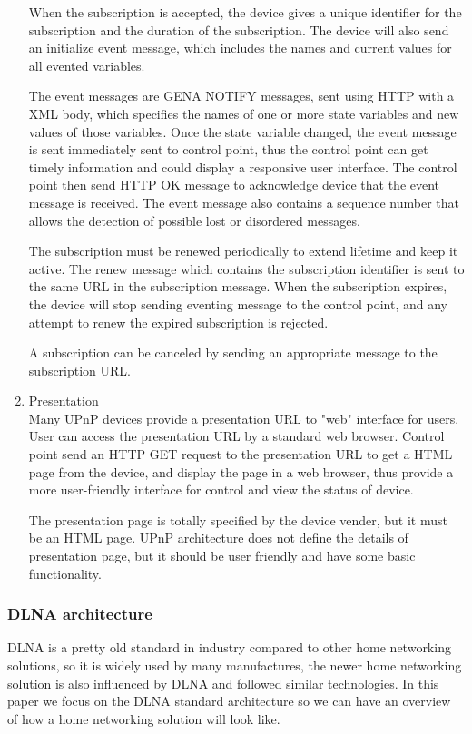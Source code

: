 \begin{enumerate}
When the subscription is accepted, the device gives a unique identifier for the subscription and 
the duration of the subscription. The device will also send an initialize event message, which 
includes the names and current values for all evented variables.

The event messages are GENA NOTIFY messages, sent using HTTP with a XML body, which specifies the 
names of one or more state variables and new values of those variables. Once the state variable 
changed, the event message is sent immediately sent to control point, thus the control point can 
get timely information and could display a responsive user interface. The control point then send 
HTTP OK message to acknowledge device that the event message is received. The event message also 
contains a sequence number that allows the detection of possible lost or disordered messages.

The subscription must be renewed periodically to extend lifetime and keep it active. The renew 
message which contains the subscription identifier is sent to the same URL in the subscription 
message. When the subscription expires, the device will stop sending eventing message to the 
control point, and any attempt to renew the expired subscription is rejected.

A subscription can be canceled by sending an appropriate message to the subscription URL.

\item Presentation \\
Many UPnP devices provide a presentation URL to "web" interface for users. User can access the 
presentation URL by a standard web browser. Control point send an HTTP GET request to the 
presentation URL to get a HTML page from the device, and display the page in a web browser, thus 
provide a more user-friendly interface for control and view the status of device. 

The presentation page is totally specified by the device vender, but it must be an HTML page. 
UPnP architecture does not define the details of presentation page, but it should be user friendly 
and have some basic functionality.

\end{enumerate}
\subsubsection*{DLNA architecture}
DLNA is a pretty old standard in industry compared to other home networking solutions, so it 
is widely used by many manufactures, the newer home networking solution is also influenced by 
DLNA and followed similar technologies. In this paper we focus on the DLNA standard architecture 
so we can have an overview of how a home networking solution will look like.

